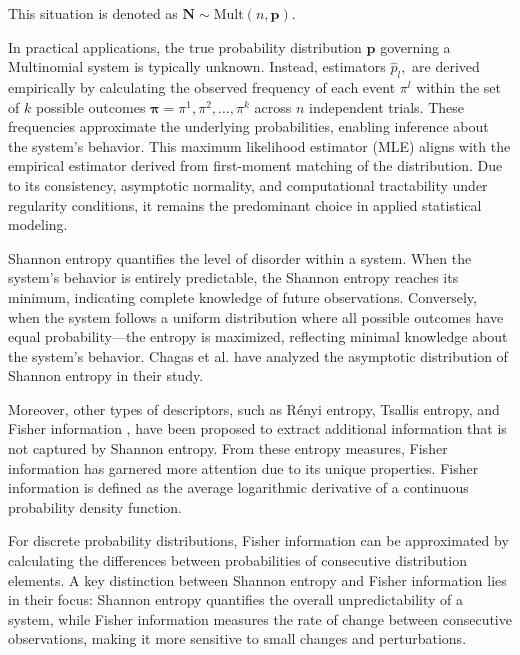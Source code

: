 This situation is denoted as $\bm{N}\sim \text{Mult}(n,\bm{p}).$ \cite{Rey2023}
   
      
In practical applications, the true probability distribution $\bm{p}$ governing a Multinomial system is typically unknown. Instead, estimators $\widehat{p}_l,$ are derived empirically by calculating the observed frequency of each event $\pi^l$ within the set of $k$ possible outcomes $\bm{\pi}=\pi^1,\pi^2, \dots, \pi^k$  across $n$ independent trials. These frequencies approximate the underlying probabilities, enabling inference about the system’s behavior. This maximum likelihood estimator (MLE) aligns with the empirical estimator derived from first-moment matching of the distribution. Due to its consistency, asymptotic normality, and computational tractability under regularity conditions, it remains the predominant choice in applied statistical modeling.

Shannon entropy quantifies the level of disorder within a system. When the system's behavior is entirely predictable, the Shannon entropy reaches its minimum, indicating complete knowledge of future observations. Conversely, when the system follows a uniform distribution where all possible outcomes have equal probability—the entropy is maximized, reflecting minimal knowledge about the system's behavior. Chagas et al. \cite{Chagas2022} have analyzed the asymptotic distribution of Shannon entropy in their study. 


Moreover, other types of descriptors, such as Rényi entropy\cite{renyi1961measures}, Tsallis entropy\cite{tsallis1988possible}, and Fisher information \cite{frieden2004science}, have been proposed to extract additional information that is not captured by Shannon entropy.
From these entropy measures, Fisher information has garnered more attention due to its unique properties. Fisher information is defined as the average logarithmic derivative of a continuous probability density function.

For discrete probability distributions, Fisher information can be approximated by calculating the differences between probabilities of consecutive distribution elements. A key distinction between Shannon entropy and Fisher information lies in their focus: Shannon entropy quantifies the overall unpredictability of a system, while Fisher information measures the rate of change between consecutive observations, making it more sensitive to small changes and perturbations.

